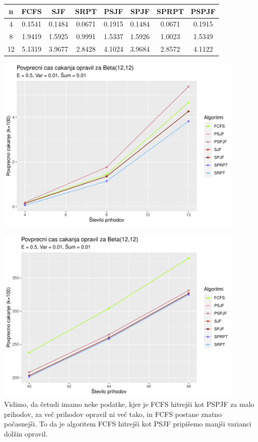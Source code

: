 \documentclass[a4paper, pt14]{article}
\begin{document}
\begin{center}
\begin{tabular}{||c c c c c c c c||} 
 \hline
 n & FCFS & SJF & SRPT & PSJF & SPJF & SPRPT & PSPJF \\ [0.5ex] 
 \hline\hline
 4 & 0.1541 & 0.1484 & 0.0671 & 0.1915 & 0.1484 & 0.0671 & 0.1915\\ 
 \hline
 8 & 1.9419 & 1.5925 & 0.9991 & 1.5337 & 1.5926 & 1.0023 & 1.5349 \\
 \hline
 12 & 5.1319 & 3.9677 & 2.8428 & 4.1024 & 3.9684 & 2.8572 & 4.1122 \\
 \hline
\end{tabular}
\end{center}


\includegraphics[width=12.1cm,keepaspectratio]{Beta_grafi_razclenitev1.pdf}


\includegraphics[width=12.1cm,keepaspectratio]{Beta_grafi_razclenitev2.pdf}
\\Vidimo, da četudi imamo neke podatke, kjer je FCFS hitrejši kot PSPJF za malo prihodov, za več prihodov opravil ni več tako, in FCFS postane znatno počasnejši. To da je algoritem FCFS hitrejši kot PSJF pripišemo manjši varianci dolžin opravil.
\end{document}
